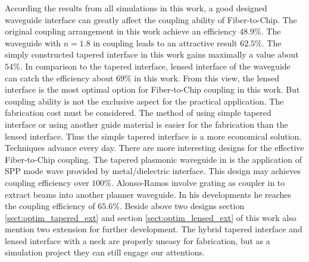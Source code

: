 According the results from all simulations in this work, a good designed waveguide interface can greatly affect the coupling ability of Fiber-to-Chip. The original coupling arrangement in this work achieve an efficiency $48.9\%$. The waveguide with $n=1.8$ in coupling leads to an attractive result $62.5\%$. The simply constructed tapered interface in this work gains maximally a value about $54\%$. In comparison to the tapered interface, lensed interface of the waveguide can catch the efficiency about $69\%$ in this work. From this view, the lensed interface is the most optimal option for Fiber-to-Chip coupling in this work. But coupling ability is not the exclusive aspect for the practical application. The fabrication cost must be considered. The method of using simple tapered interface or using another guide material is easier for the fabrication than the lensed interface. Thus the simple tapered interface is a more economical solution. \\
       
Techniques advance every day. There are more interesting designs for the effective Fiber-to-Chip coupling. The tapered plasmonic waveguide in \cite{tapered_plasmonic_waveguides} is the application of SPP mode wave provided by metal/dielectric interface. This design may achieves coupling efficiency over $100\%$. Alonso-Ramos involve grating as coupler in \cite{fiber_to_chip_grating_waveguides}  to extract beams into another planner waveguide. In his developments he reaches the coupling efficiency of $65.6\%$. Beside above two designs section \ref{sect:optim_tapered_ext} and section \ref{sect:optim_lensed_ext} of this work also mention two extension for further development. The hybrid tapered interface and lensed interface with a neck are properly uneasy for fabrication, but as a simulation project they can still engage our attentions.
